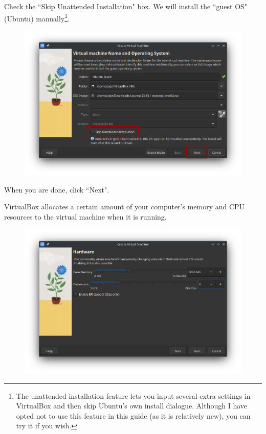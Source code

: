 \documentclass[12pt]{article}
\begin{document}
Check the ``Skip Unattended Installation" box. We will install the ``guest OS" (Ubuntu) manually\footnote{The unattended installation feature lets you input several extra settings in VirtualBox and then skip Ubuntu's own install dialogue. Although I have opted not to use this feature in this guide (as it is relatively new), you can try it if you wish.}.

\begin{figure}[htp]
    \centering
    \includegraphics[width=\textwidth]{1-4.png}
\end{figure}

When you are done, click ``Next".

\pagebreak

VirtualBox allocates a certain amount of your computer's memory and CPU resources to the virtual machine when it is running. 

\begin{figure}[htp]
    \centering
    \includegraphics[width=\textwidth]{1-6.png}
\end{figure}
\end{document}
